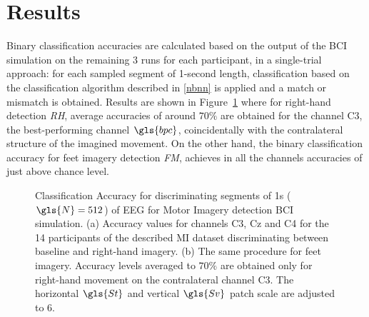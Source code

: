 \section{Results}

Binary classification accuracies are calculated based on the output of the BCI simulation on the remaining 3 runs for each participant, in a single-trial approach: for each sampled segment of 1-second length, classification based on the classification algorithm described in \ref{nbnn} is applied and a match or mismatch is obtained.  Results are shown in Figure~\ref{fig:miresults} where for right-hand detection \textit{RH}, average accuracies of around $70\%$ are obtained for the channel C3, the best-performing channel $\gls{bpc}$, coincidentally with the contralateral structure of the imagined movement.  On the other hand, the binary classification accuracy for feet imagery detection \textit{FM}, achieves in all the channels accuracies of just above chance level.

   
\begin{figure}[h!]
\centering
{}
\caption[Motor Imagery Accuracy]{Classification Accuracy for discriminating segments of 1s ($\gls{N} = 512$) of EEG for Motor Imagery detection BCI simulation. (a) Accuracy values for channels C3, Cz and C4 for the 14 participants of the described MI dataset discriminating between baseline and right-hand imagery. (b) The same procedure for feet imagery. Accuracy levels averaged to $70\%$ are obtained only for right-hand movement on the contralateral channel C3. The horizontal $\gls{St}$ and vertical $\gls{Sv}$ patch scale are adjusted to $6$.}
\label{fig:miresults}
\end{figure}


